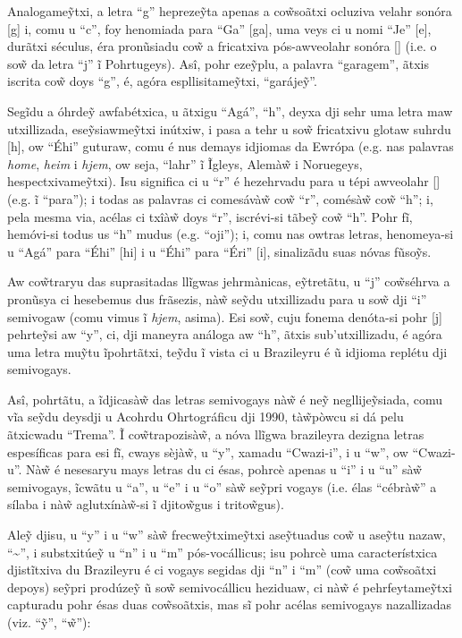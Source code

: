 \documentclass[12pt, a5paper, titlepage]{article}
\begin{document}
\begin{bilingualpages}
    Analogame\~ytxi, a letra ``g'' hepreze\~yta apenas a co\~wsoãtxi ocluziva
    velahr sonóra [g] i, comu u ``c'', foy henomiada para ``Ga'' [ga], uma veys ci
    u nomi ``Je'' [\textyogh e], durãtxi séculus, éra pronũsiadu co\~w a fricatxiva
    pós-awveolahr sonóra [\textyogh] (i.e. o so\~w da letra ``j'' ĩ Pohrtugeys).
    Asî, pohr eze\~yplu, a palavra ``garagem'', ãtxis iscrita co\~w doys ``g'', é,
    agóra espllisitame\~ytxi, ``garáje\~y''.

    Segĩdu a óhrde\~y awfabétxica, u ãtxigu ``Agá'', ``h'', deyxa dji sehr uma
    letra maw utxillizada, ese\~ysiawme\~ytxi inútxiw, i pasa a tehr u so\~w
    fricatxivu glotaw suhrdu [h], ow ``Éhi'' guturaw, comu é nus demays idjiomas da
    Ewrópa (e.g. nas palavras \textit{home}, \textit{heim} i \textit{hjem}, ow
    seja, ``lahr'' ĩ Ĩgleys, Alemà\~w i Noruegeys, hespectxivame\~ytxi). Isu
    significa ci u ``r'' é hezehrvadu para u tépi awveolahr [\textfishhookr] (e.g.
    ĩ ``para''); i todas as palavras ci comesávà\~w co\~w ``r'', comésà\~w co\~w
    ``h''; i, pela mesma via, acélas ci txîà\~w doys ``r'', iscrévi-si tãbe\~y
    co\~w ``h''. Pohr fĩ, hemóvi-si todus us ``h'' mudus (e.g. ``oji''); i, comu
    nas owtras letras, henomeya-si u ``Agá'' para ``Éhi'' [\textepsilon hi] i u
    ``Éhi'' para ``Éri'' [\textepsilon \textfishhookr i], sinalizãdu suas nóvas
    fũso\~ys.

    Aw co\~wtraryu das suprasitadas llĩgwas jehrmànicas, e\~ytretãtu, u ``j''
    co\~wséhrva a pronũsya ci hesebemus dus frãsezis, nà\~w se\~ydu utxillizadu
    para u so\~w dji ``i'' semivogaw (comu vimus ĩ \textit{hjem}, asima). Esi
    so\~w, cuju fonema denóta-si pohr [j] pehrte\~ysi aw ``y'', ci, dji maneyra
    análoga aw ``h'', ãtxis sub'utxillizadu, é agóra uma letra mu\~ytu ĩpohrtãtxi,
    te\~ydu ĩ vista ci u Brazileyru é ũ idjioma replétu dji semivogays.

    Asî, pohrtãtu, a ĩdjicasà\~w das letras semivogays nà\~w é ne\~y
    negllije\~ysiada, comu vĩa se\~ydu deysdji u Acohrdu Ohrtográficu dji 1990,
    tà\~wpòwcu si dá pelu ãtxicwadu ``Trema''. Ĩ co\~wtrapozisà\~w, a nóva llĩgwa
    brazileyra dezigna letras espesíficas para esi fĩ, cways sèjà\~w, u ``y'',
    xamadu ``Cwazi-i'', i u ``w'', ow ``Cwazi-u''. Nà\~w é nesesaryu mays letras du
    ci ésas, pohrcè apenas u ``i'' i u ``u'' sà\~w semivogays, ĩcwãtu u ``a'', u
    ``e'' i u ``o'' sà\~w se\~ypri vogays (i.e. élas ``cébrà\~w'' a sílaba i nà\~w
    aglutxínà\~w-si ĩ djito\~wgus i trito\~wgus).

    Ale\~y djisu, u ``y'' i u ``w'' sà\~w frecwe\~ytxime\~ytxi ase\~ytuadus co\~w u
    ase\~ytu nazaw, ``\textasciitilde'', i substxitúe\~y u ``n'' i u ``m''
    pós-vocállicus; isu pohrcè uma característxica djistĩtxiva du Brazileyru é ci
    vogays segidas dji ``n'' i ``m'' (co\~w uma co\~wsoãtxi depoys) se\~ypri
    prodúze\~y ũ so\~w semivocállicu heziduaw, ci nà\~w é pehrfeytame\~ytxi
    capturadu pohr ésas duas co\~wsoãtxis, mas sĩ pohr acélas semivogays
    nazallizadas (viz. ``\~y'', ``\~w''):


\end{bilingualpages}
\end{document}
